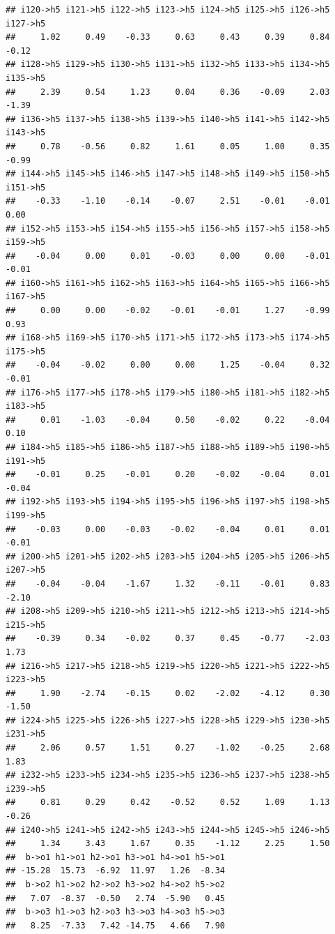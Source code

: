 \documentclass[
]{article}
\begin{document}
\begin{verbatim}
## i120->h5 i121->h5 i122->h5 i123->h5 i124->h5 i125->h5 i126->h5 i127->h5 
##     1.02     0.49    -0.33     0.63     0.43     0.39     0.84    -0.12 
## i128->h5 i129->h5 i130->h5 i131->h5 i132->h5 i133->h5 i134->h5 i135->h5 
##     2.39     0.54     1.23     0.04     0.36    -0.09     2.03    -1.39 
## i136->h5 i137->h5 i138->h5 i139->h5 i140->h5 i141->h5 i142->h5 i143->h5 
##     0.78    -0.56     0.82     1.61     0.05     1.00     0.35    -0.99 
## i144->h5 i145->h5 i146->h5 i147->h5 i148->h5 i149->h5 i150->h5 i151->h5 
##    -0.33    -1.10    -0.14    -0.07     2.51    -0.01    -0.01     0.00 
## i152->h5 i153->h5 i154->h5 i155->h5 i156->h5 i157->h5 i158->h5 i159->h5 
##    -0.04     0.00     0.01    -0.03     0.00     0.00    -0.01    -0.01 
## i160->h5 i161->h5 i162->h5 i163->h5 i164->h5 i165->h5 i166->h5 i167->h5 
##     0.00     0.00    -0.02    -0.01    -0.01     1.27    -0.99     0.93 
## i168->h5 i169->h5 i170->h5 i171->h5 i172->h5 i173->h5 i174->h5 i175->h5 
##    -0.04    -0.02     0.00     0.00     1.25    -0.04     0.32    -0.01 
## i176->h5 i177->h5 i178->h5 i179->h5 i180->h5 i181->h5 i182->h5 i183->h5 
##     0.01    -1.03    -0.04     0.50    -0.02     0.22    -0.04     0.10 
## i184->h5 i185->h5 i186->h5 i187->h5 i188->h5 i189->h5 i190->h5 i191->h5 
##    -0.01     0.25    -0.01     0.20    -0.02    -0.04     0.01    -0.04 
## i192->h5 i193->h5 i194->h5 i195->h5 i196->h5 i197->h5 i198->h5 i199->h5 
##    -0.03     0.00    -0.03    -0.02    -0.04     0.01     0.01    -0.01 
## i200->h5 i201->h5 i202->h5 i203->h5 i204->h5 i205->h5 i206->h5 i207->h5 
##    -0.04    -0.04    -1.67     1.32    -0.11    -0.01     0.83    -2.10 
## i208->h5 i209->h5 i210->h5 i211->h5 i212->h5 i213->h5 i214->h5 i215->h5 
##    -0.39     0.34    -0.02     0.37     0.45    -0.77    -2.03     1.73 
## i216->h5 i217->h5 i218->h5 i219->h5 i220->h5 i221->h5 i222->h5 i223->h5 
##     1.90    -2.74    -0.15     0.02    -2.02    -4.12     0.30    -1.50 
## i224->h5 i225->h5 i226->h5 i227->h5 i228->h5 i229->h5 i230->h5 i231->h5 
##     2.06     0.57     1.51     0.27    -1.02    -0.25     2.68     1.83 
## i232->h5 i233->h5 i234->h5 i235->h5 i236->h5 i237->h5 i238->h5 i239->h5 
##     0.81     0.29     0.42    -0.52     0.52     1.09     1.13    -0.26 
## i240->h5 i241->h5 i242->h5 i243->h5 i244->h5 i245->h5 i246->h5 
##     1.34     3.43     1.67     0.35    -1.12     2.25     1.50 
##  b->o1 h1->o1 h2->o1 h3->o1 h4->o1 h5->o1 
## -15.28  15.73  -6.92  11.97   1.26  -8.34 
##  b->o2 h1->o2 h2->o2 h3->o2 h4->o2 h5->o2 
##   7.07  -8.37  -0.50   2.74  -5.90   0.45 
##  b->o3 h1->o3 h2->o3 h3->o3 h4->o3 h5->o3 
##   8.25  -7.33   7.42 -14.75   4.66   7.90
\end{verbatim}
\end{document}
